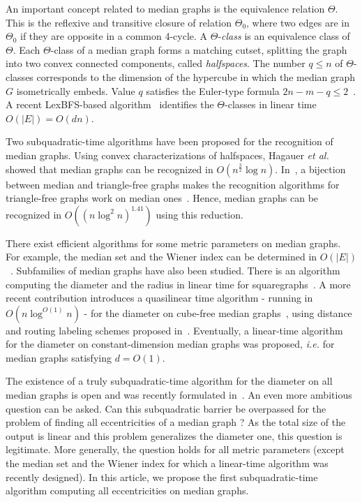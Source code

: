 \documentclass[a4paper,UKenglish,numberwithinsect,cleveref, autoref]{lipics-v2021}
\newcommand{\card}[1]{\left| #1 \right|}
\begin{document}
An important concept related to median graphs is the equivalence relation $\Theta$. This is the reflexive and transitive closure of relation $\Theta_0$, where two edges are in $\Theta_0$ if they are opposite in a common 4-cycle. A $\Theta$-\textit{class} is an equivalence class of $\Theta$. Each $\Theta$-class of a median graph forms a matching cutset, splitting the graph into two convex connected components, called \textit{halfspaces}. The number $q \le n$ of $\Theta$-classes corresponds to the dimension of the hypercube in which the median graph $G$ isometrically embeds.  Value $q$ satisfies the Euler-type formula $2n-m-q\le 2$~\cite{KlMuSk98}. A recent LexBFS-based algorithm~\cite{BeChChVa20} identifies the $\Theta$-classes in linear time $O(\card{E})=O(dn)$.

Two subquadratic-time algorithms have been proposed for the recognition of median graphs. Using convex characterizations of halfspaces, Hagauer {\em et al.}~\cite{HaImKl99} showed that median graphs can be recognized in $O(n^{\frac{3}{2}}\log{n})$. In~\cite{ImKlMu99}, a bijection between median and triangle-free graphs makes the recognition algorithms for triangle-free graphs work on median ones~\cite{AlYuZw97}. Hence, median graphs can be recognized in $O((n\log^2 n)^{1.41})$ using this reduction.

There exist efficient algorithms for some metric parameters on median graphs. For example, the median set and the Wiener index can be determined in $O(\card{E})$~\cite{BeChChVa20}. 
Subfamilies of median graphs have also been studied. There is an algorithm computing the diameter and the radius in linear time for squaregraphs~\cite{ChDrVa02}. A more recent contribution introduces a quasilinear time algorithm - running in $O(n\log^{O(1)} n)$ - for the diameter on cube-free median graphs~\cite{Du20}, using distance and routing labeling schemes proposed in~\cite{ChLaRa19}. Eventually, a linear-time algorithm~\cite{BeHa21} for the diameter on constant-dimension median graphs was proposed, {\em i.e.} for median graphs satisfying $d=O(1)$.

The existence of a truly subquadratic-time algorithm for the diameter on all median graphs is open and was recently formulated in~\cite{BeChChVa20,BeHa21,Du20}. An even more ambitious question can be asked. Can this subquadratic barrier be overpassed for the problem of finding all eccentricities of a median graph ? As the total size of the output is linear and this problem generalizes the diameter one, this question is legitimate. More generally, the question holds for all metric parameters (except the median set and the Wiener index for which a linear-time algorithm was recently designed). In this article, we propose the first subquadratic-time algorithm computing all eccentricities on median graphs. 
\end{document}
